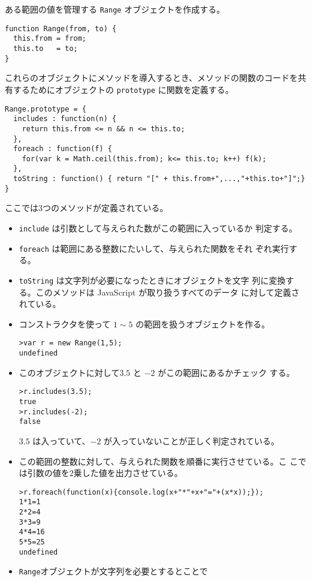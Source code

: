 \begin{Exec}\label{ExRange}\upshape
ある範囲の値を管理する \texttt{Range} オブジェクトを作成する。
\begin{verbatim}
function Range(from, to) {
  this.from = from;
  this.to   = to;
}
\end{verbatim}
これらのオブジェクトにメソッドを導入するとき、メソッドの関数のコードを共
 有するためにオブジェクトの \texttt{prototype} に関数を定義する。
\begin{verbatim}
Range.prototype = {
  includes : function(n) {
    return this.from <= n && n <= this.to;
  },
  foreach : function(f) {
    for(var k = Math.ceil(this.from); k<= this.to; k++) f(k);
  },
  toString : function() { return "[" + this.from+",...,"+this.to+"]";}
}
\end{verbatim}
ここでは3つのメソッドが定義されている。
\begin{itemize}
 \item \texttt{include} は引数として与えられた数がこの範囲に入っているか
       判定する。
 \item \texttt{foreach} は範囲にある整数にたいして、与えられた関数をそれ
       ぞれ実行する。
 \item \texttt{toString} は文字列が必要になったときにオブジェクトを文字
       列に変換する。このメソッドは JavaScript が取り扱うすべてのデータ
       に対して定義されている。
\end{itemize}
\begin{itemize}
 \item コンストラクタを使って $1\sim5$ の範囲を扱うオブジェクトを作る。
\begin{verbatim}
>var r = new Range(1,5);
undefined
\end{verbatim}
 \item このオブジェクトに対して$3.5$ と $-2$ がこの範囲にあるかチェック
       する。
\begin{verbatim}
>r.includes(3.5);
true
>r.includes(-2);
false
\end{verbatim}
$3.5$ は入っていて、$-2$ が入っていないことが正しく判定されている。
 \item この範囲の整数に対して、与えられた関数を順番に実行させている。こ
       こでは引数の値を$2$乗した値を出力させている。
\begin{verbatim}
>r.foreach(function(x){console.log(x+"*"+x+"="+(x*x));});
1*1=1
2*2=4
3*3=9
4*4=16
5*5=25
undefined
\end{verbatim}
 \item \texttt{Range}オブジェクトが文字列を必要とするとことで

\end{itemize}
\end{Exec}

